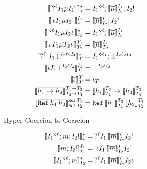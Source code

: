 \documentclass[acmtog, authorversion, acmlarge]{acmart}
\begin{document}
\begin{figure}[tbh]
\begin{subfigure}{.5\textwidth}
    \begin{align*}
      \interp{\hc{\prj{\Lbl}}{\I_1}{\Med}{\I_2}{\inj}}
             {\Dyn} {\Dyn}
      &=
      \Seq{\prj[\I_1]{\Lbl}}
          {\Seq{\interpm{\Med}{\I_1}{\I_2}}{\inj[\I_2]}}
      \\
      \interp{\hc{\pmt}{\I_1}{\Med}{\I_2}{\inj}}{\I_1}{\Dyn}
      &=
      \Seq{\interpm{\Med}{\I_1}{\I_2}}{\inj[\I_2]}
      \\
      \interp{\hc{\prj{\Lbl}}{\I_1}{\Med}{\I_2}{\imt}}
             {\Dyn}{\I_2}
      &=
      \Seq{\prj[\I_1]{\Lbl}}{\interpm{\Med}{\I_1}{\I_2}}
      \\
      \interp{\hc{\pmt}{\T_1}{\Med}{\T_2}{\imt}}{\T_1}{\T_2}
      &= \interpm{\Med}{\T_1}{\T_2}
      \\
      \interp{\hcfail{\prj{\Lbl_1}}{\I_1}{\I_2}{\Lbl_2}{\I_3}}
             {\Dyn}{\T}
      &=
      \Seq{\prj[\I_1]{\Lbl_1}}{\failed{\I_2}{\Lbl_2}{\I_3}}
      \\
      \interp{\hcfail{\pmt}{\I_1}{\I_2}{\Lbl}{\I_3}}
             {\I_1}{\T}
             &=
      \failed{\I_2}{\Lbl}{\I_3}
      \\
      \interpm{\id}{\T}{\T} &= \id[\T]
      \\
      \interpm{\fn{\HC_1}{\HC_2}}
             {\Fn{\T_1}{\T_2}}{\Fn{\T_3}{\T_4}}
             &=
      \fn{\interp{\HC_1}{\T_3}{\T_1}}
         {\interp{\HC_2}{\T_2}{\T_4}}
      \\
      \interpm{\rf{\HC_1}{\HC_2}}
             {\Ref{\T_1}}{\Ref{\T_2}}
             &=
      \rf{\interp{\HC_1}{\T_2}{\T_1}}
         {\interp{\HC_2}{\T_1}{\T_2}}
    \end{align*}
    \caption{Hyper-Coercion to Coercion}
    \label{fig:h2c}
  \end{subfigure}%
    \begin{subfigure}{.5\textwidth}
      \begin{align*}
        \interp{\Seq{\prj[\I_1]{\Lbl}}
                    {\Seq{\Int}{\inj[\I_2]}}}
               {\Dyn}{\Dyn}
        &=
        \hc{\prj{\Lbl}}{\I_1}
           {\interpm{\Int}{\I_1}{\I_2}}
           {\I_2}{\inj}
      \\
      \interp{\Seq{\Int}{\inj[\I_2]}}{\I_1}{\Dyn}
      &=
      \hc{\pmt}{\I_1}
         {\interpm{\Int}{\I_1}{\I_2}}
         {\I_2}{\inj}
      \\
      \interp{\Seq{\prj[\I_1]{\Lbl}}{\Int}}
             {\Dyn}{\I_2}
      &=
       \hc{\prj{\Lbl}}{\I_1}
          {\interpm{\Int}{\I_1}{\I_2}}
          {\I_2}{\imt}
      \\

\end{align*}
\end{subfigure}
\end{figure}
\end{document}

